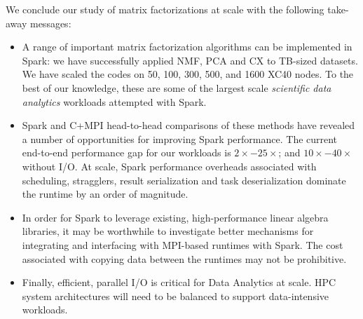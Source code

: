We conclude our study of matrix factorizations at scale with the following take-away messages: 
\begin{itemize}
\item{A range of important matrix factorization algorithms can be implemented in Spark: we have successfully applied NMF, PCA and CX to TB-sized datasets. We have scaled the codes on 50, 100, 300, 500, and 1600 XC40 nodes. To the best of our knowledge, these are some of the largest scale \emph{scientific data analytics} workloads attempted with Spark.}
\item{Spark and C+MPI head-to-head comparisons of these methods have revealed a number of opportunities for improving Spark performance. The current end-to-end performance gap for our workloads is $2\times - 25\times$; and $10\times - 40\times$ without I/O. At scale, Spark performance overheads associated with scheduling, stragglers, result serialization and task deserialization dominate the runtime by an order of magnitude.}
\item{{In order for Spark to leverage existing, high-performance linear algebra libraries, it may be worthwhile to investigate better mechanisms for integrating and interfacing with MPI-based runtimes with Spark. The cost associated with copying data between the runtimes may not be prohibitive.}}
\item{Finally, efficient, parallel I/O is critical for Data Analytics at scale. HPC system architectures will need to be balanced to support data-intensive workloads.}
\end{itemize}